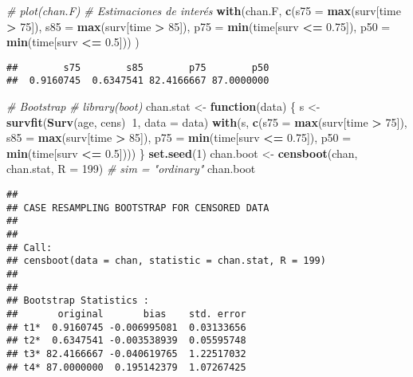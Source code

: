\documentclass[
]{book}
\newenvironment{Shaded}{\begin{snugshade}}{\end{snugshade}}
\newcommand{\CommentTok}[1]{\textcolor[rgb]{0.56,0.35,0.01}{\textit{#1}}}
\newcommand{\ControlFlowTok}[1]{\textcolor[rgb]{0.13,0.29,0.53}{\textbf{#1}}}
\newcommand{\DataTypeTok}[1]{\textcolor[rgb]{0.13,0.29,0.53}{#1}}
\newcommand{\DecValTok}[1]{\textcolor[rgb]{0.00,0.00,0.81}{#1}}
\newcommand{\FloatTok}[1]{\textcolor[rgb]{0.00,0.00,0.81}{#1}}
\newcommand{\KeywordTok}[1]{\textcolor[rgb]{0.13,0.29,0.53}{\textbf{#1}}}
\newcommand{\NormalTok}[1]{#1}
\newcommand{\OperatorTok}[1]{\textcolor[rgb]{0.81,0.36,0.00}{\textbf{#1}}}
\newcommand{\StringTok}[1]{\textcolor[rgb]{0.31,0.60,0.02}{#1}}
\theoremstyle{definition}
\theoremstyle{definition}
\theoremstyle{definition}
\theoremstyle{remark}
\begin{document}
\begin{Shaded}
\begin{Highlighting}[]
\CommentTok{# plot(chan.F)}
\CommentTok{# Estimaciones de interés}
\KeywordTok{with}\NormalTok{(chan.F, }
    \KeywordTok{c}\NormalTok{(}\DataTypeTok{s75 =} \KeywordTok{max}\NormalTok{(surv[time }\OperatorTok{>}\StringTok{ }\DecValTok{75}\NormalTok{]), }\DataTypeTok{s85 =} \KeywordTok{max}\NormalTok{(surv[time }\OperatorTok{>}\StringTok{ }\DecValTok{85}\NormalTok{]),}
      \DataTypeTok{p75 =} \KeywordTok{min}\NormalTok{(time[surv }\OperatorTok{<=}\StringTok{ }\FloatTok{0.75}\NormalTok{]), }\DataTypeTok{p50 =} \KeywordTok{min}\NormalTok{(time[surv }\OperatorTok{<=}\StringTok{ }\FloatTok{0.5}\NormalTok{])) }
\NormalTok{)}
\end{Highlighting}
\end{Shaded}

\begin{verbatim}
##        s75        s85        p75        p50 
##  0.9160745  0.6347541 82.4166667 87.0000000
\end{verbatim}

\begin{Shaded}
\begin{Highlighting}[]
\CommentTok{# Bootstrap}
\CommentTok{# library(boot)}
\NormalTok{chan.stat <-}\StringTok{ }\ControlFlowTok{function}\NormalTok{(data) \{}
\NormalTok{    s <-}\StringTok{ }\KeywordTok{survfit}\NormalTok{(}\KeywordTok{Surv}\NormalTok{(age, cens)}\OperatorTok{~}\DecValTok{1}\NormalTok{, }\DataTypeTok{data =}\NormalTok{ data)}
    \KeywordTok{with}\NormalTok{(s, }\KeywordTok{c}\NormalTok{(}\DataTypeTok{s75 =} \KeywordTok{max}\NormalTok{(surv[time }\OperatorTok{>}\StringTok{ }\DecValTok{75}\NormalTok{]), }\DataTypeTok{s85 =} \KeywordTok{max}\NormalTok{(surv[time }\OperatorTok{>}\StringTok{ }\DecValTok{85}\NormalTok{]),}
            \DataTypeTok{p75 =} \KeywordTok{min}\NormalTok{(time[surv }\OperatorTok{<=}\StringTok{ }\FloatTok{0.75}\NormalTok{]), }\DataTypeTok{p50 =} \KeywordTok{min}\NormalTok{(time[surv }\OperatorTok{<=}\StringTok{ }\FloatTok{0.5}\NormalTok{])))}
\NormalTok{\}}
\KeywordTok{set.seed}\NormalTok{(}\DecValTok{1}\NormalTok{)}
\NormalTok{chan.boot <-}\StringTok{ }\KeywordTok{censboot}\NormalTok{(chan, chan.stat, }\DataTypeTok{R =} \DecValTok{199}\NormalTok{) }\CommentTok{# sim = "ordinary"}
\NormalTok{chan.boot}
\end{Highlighting}
\end{Shaded}

\begin{verbatim}
## 
## CASE RESAMPLING BOOTSTRAP FOR CENSORED DATA
## 
## 
## Call:
## censboot(data = chan, statistic = chan.stat, R = 199)
## 
## 
## Bootstrap Statistics :
##       original       bias    std. error
## t1*  0.9160745 -0.006995081  0.03133656
## t2*  0.6347541 -0.003538939  0.05595748
## t3* 82.4166667 -0.040619765  1.22517032
## t4* 87.0000000  0.195142379  1.07267425
\end{verbatim}
\end{document}
